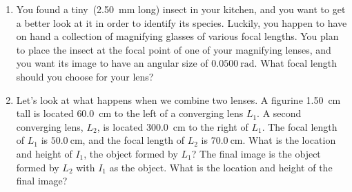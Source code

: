 \documentclass[11pt]{article}
\begin{document}
\begin{enumerate}

\newcommand{\inlen}{\SI{2.50}{\mm}}
\newcommand{\angsize}{\SI{0.0500}{\radian}}

\item You found a tiny~({\inlen} long) insect in your kitchen, and you want to get a better look at it in order to identify its species.  Luckily, you happen to have on hand a collection of magnifying glasses of various focal lengths.  You plan to place the insect at the focal point of one of your magnifying lenses, and you want its image to have an angular size of $\angsize$.  What focal length should you choose for your lens?

\newcommand{\objheight}{\SI{1.50}{\cm}}
\newcommand{\odist}{\SI{60.0}{\cm}}
\newcommand{\flenq}{\SI{50.0}{\cm}}
\newcommand{\flenw}{\SI{70.0}{\cm}}
\newcommand{\lensep}{\SI{300.0}{\cm}}
\newcommand{\Lq}{L_1}
\newcommand{\Lw}{L_2}
\newcommand{\Iq}{I_1}
\newcommand{\Iw}{I_2}


\item Let's look at what happens when we combine two lenses.  A figurine {\objheight} tall is located {\odist} to the left of a converging lens $\Lq$.  A second converging lens, $\Lw$, is located {\lensep} to the right of $\Lq$.  The focal length of $\Lq$ is $\flenq$, and the focal length of $\Lw$ is $\flenw$.  What is the location and height of $\Iq$, the object formed by $\Lq$?  The final image is the object formed by $\Lw$ with $\Iq$ as the object.  What is the location and height of the final image?

\end{enumerate}
\end{document}
